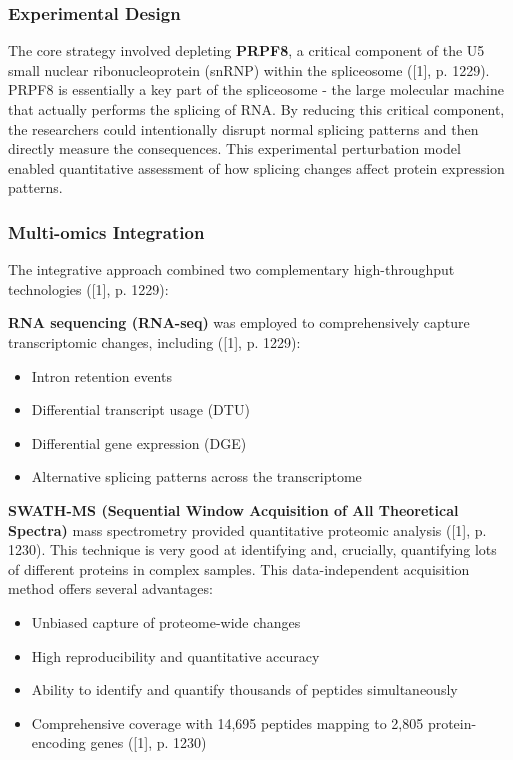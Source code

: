 \documentclass[12pt,a4paper]{article}
\begin{document}
\subsubsection{Experimental Design}

The core strategy involved depleting \textbf{PRPF8}, a critical component of the U5 small nuclear ribonucleoprotein (snRNP) within the spliceosome ([1], p. 1229). PRPF8 is essentially a key part of the spliceosome - the large molecular machine that actually performs the splicing of RNA. By reducing this critical component, the researchers could intentionally disrupt normal splicing patterns and then directly measure the consequences. This experimental perturbation model enabled quantitative assessment of how splicing changes affect protein expression patterns.

\subsubsection{Multi-omics Integration}

The integrative approach combined two complementary high-throughput technologies ([1], p. 1229):

\textbf{RNA sequencing (RNA-seq)} was employed to comprehensively capture transcriptomic changes, including ([1], p. 1229):
\begin{itemize}
    \item Intron retention events
    \item Differential transcript usage (DTU)
    \item Differential gene expression (DGE)
    \item Alternative splicing patterns across the transcriptome
\end{itemize}

\textbf{SWATH-MS (Sequential Window Acquisition of All Theoretical Spectra)} mass spectrometry provided quantitative proteomic analysis ([1], p. 1230). This technique is very good at identifying and, crucially, quantifying lots of different proteins in complex samples. This data-independent acquisition method offers several advantages:
\begin{itemize}
    \item Unbiased capture of proteome-wide changes
    \item High reproducibility and quantitative accuracy
    \item Ability to identify and quantify thousands of peptides simultaneously
    \item Comprehensive coverage with 14,695 peptides mapping to 2,805 protein-encoding genes ([1], p. 1230)
\end{itemize}
\end{document}
